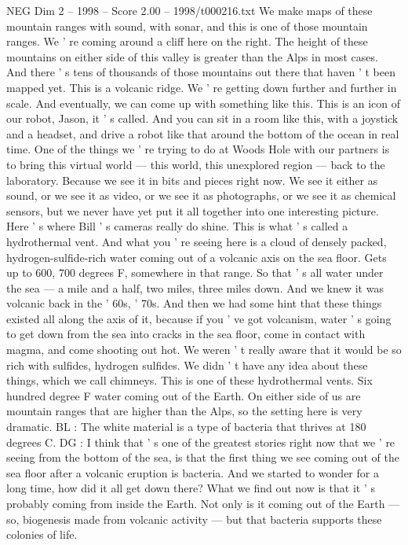 \begin{textsample}{NEG Dim 2 – 1998 – Score 2.00 – 1998/t000216.txt}
We make maps of these mountain ranges with sound, with sonar, and this is one of those mountain ranges.
We ' re coming around a cliff here on the right.
The height of these mountains on either side of this valley is greater than the Alps in most cases.
And there ' s tens of thousands of those mountains out there that haven ' t been mapped yet.
This is a volcanic ridge.
We ' re getting down further and further in scale.
And eventually, we can come up with something like this.
This is an icon of our robot, Jason, it ' s called.
And you can sit in a room like this, with a joystick and a headset, and drive a robot like that around the bottom of the ocean in real time.
One of the things we ' re trying to do at Woods Hole with our partners is to bring this virtual world — this world, this unexplored region — back to the laboratory.
Because we see it in bits and pieces right now.
We see it either as sound, or we see it as video, or we see it as photographs, or we see it as chemical sensors, but we never have yet put it all together into one interesting picture.
Here ' s where Bill ' s cameras really do shine.
This is what ' s called a hydrothermal vent.
And what you ' re seeing here is a cloud of densely packed, hydrogen-sulfide-rich water coming out of a volcanic axis on the sea floor.
Gets up to 600, 700 degrees F, somewhere in that range.
So that ' s all water under the sea — a mile and a half, two miles, three miles down.
And we knew it was volcanic back in the ' 60s, ' 70s.
And then we had some hint that these things existed all along the axis of it, because if you ' ve got volcanism, water ' s going to get down from the sea into cracks in the sea floor, come in contact with magma, and come shooting out hot.
We weren ' t really aware that it would be so rich with sulfides, hydrogen sulfides.
We didn ' t have any idea about these things, which we call chimneys.
This is one of these hydrothermal vents.
Six hundred degree F water coming out of the Earth.
On either side of us are mountain ranges that are higher than the Alps, so the setting here is very dramatic.
BL : The white material is a type of bacteria that thrives at 180 degrees C.
DG : I think that ' s one of the greatest stories right now that we ' re seeing from the bottom of the sea, is that the first thing we see coming out of the sea floor after a volcanic eruption is bacteria.
And we started to wonder for a long time, how did it all get down there?
What we find out now is that it ' s probably coming from inside the Earth.
Not only is it coming out of the Earth — so, biogenesis made from volcanic activity — but that bacteria supports these colonies of life.

\end{textsample}
